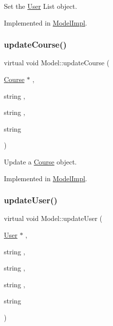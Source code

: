 Set the \hyperlink{classUser}{User} List object. 



Implemented in \hyperlink{classModelImpl_a617c58790e2b2207a3ce7e860a56e3a1}{Model\+Impl}.

\mbox{\label{classModel_aa3ea9c92f586cec1944e3dcdee8c0672}} 
\subsubsection{\texorpdfstring{update\+Course()}{updateCourse()}}
{\footnotesize\ttfamily virtual void Model\+::update\+Course (\begin{DoxyParamCaption}\item[{\hyperlink{classCourse}{Course} $\ast$}]{,  }\item[{string}]{,  }\item[{string}]{,  }\item[{string}]{ }\end{DoxyParamCaption})\hspace{0.3cm}{\ttfamily [pure virtual]}}



Update a \hyperlink{classCourse}{Course} object. 



Implemented in \hyperlink{classModelImpl_aec25920972acddf92114b2b3581b9d66}{Model\+Impl}.

\mbox{\label{classModel_a83ebd4a5678c31c8dd46155d34df961d}} 
\subsubsection{\texorpdfstring{update\+User()}{updateUser()}}
{\footnotesize\ttfamily virtual void Model\+::update\+User (\begin{DoxyParamCaption}\item[{\hyperlink{classUser}{User} $\ast$}]{,  }\item[{string}]{,  }\item[{string}]{,  }\item[{string}]{,  }\item[{string}]{ }\end{DoxyParamCaption})\hspace{0.3cm}{\ttfamily [pure virtual]}}



